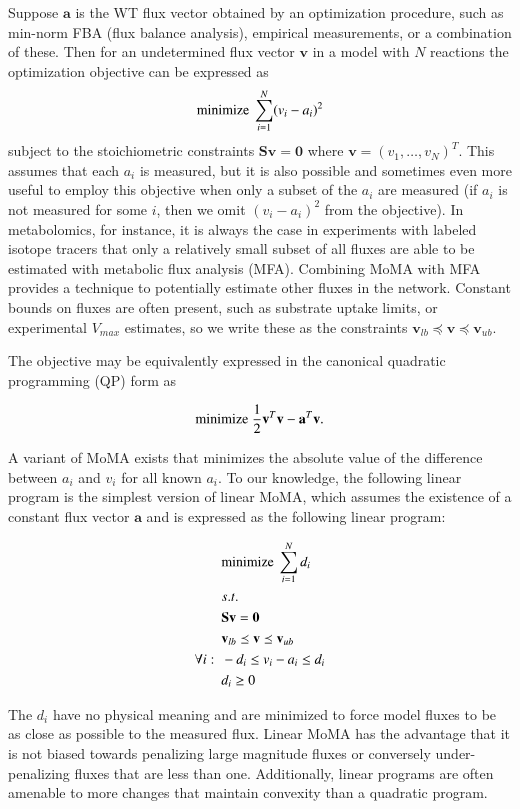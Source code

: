 Suppose $\mathbf{a}$ is the WT flux vector obtained by an optimization
procedure, such as min-norm FBA (flux balance analysis), empirical
measurements, or a combination of these. Then for an undetermined flux
vector $\mathbf{v}$ in a model with $N$ reactions the optimization
objective can be expressed as
\[ \textnormal{minimize}\ \sum\limits_{i=1}^N (v_i-a_i)^2 \] subject to the
stoichiometric constraints $\mathbf{S v} = \mathbf{0}$ where
$\mathbf{v} = (v_1, \ldots, v_N)^T$. This assumes that each $a_i$ is
measured, but it is also possible and sometimes even more useful to
employ this objective when only a subset of the $a_i$ are measured (if
$a_i$ is not measured for some $i$, then we omit $(v_i-a_i)^2$ from
the objective). In metabolomics, for instance, it is always the case
in experiments with labeled isotope tracers that only a relatively
small subset of all fluxes are able to be estimated with metabolic
flux analysis (MFA). Combining MoMA with MFA provides a technique to
potentially estimate other fluxes in the network.  Constant bounds on
fluxes are often present, such as substrate uptake limits, or
experimental $V_{max}$ estimates, so we write these as the constraints
$\mathbf{v}_{lb} \preceq \mathbf{v} \preceq \mathbf{v}_{ub}$.

The objective may be equivalently expressed in the canonical quadratic
programming (QP) form as

\[ \textnormal{minimize}\ \frac{1}{2}\mathbf{v}^T \mathbf{v} -
\mathbf{a}^T \mathbf{v}\textnormal{.}\]

A variant of MoMA exists that minimizes the absolute value of the
difference between $a_i$ and $v_i$ for all known $a_i$. To our
knowledge, the following linear program is the simplest version of
linear MoMA, which assumes the existence of a constant flux vector
$\mathbf{a}$ and is expressed as the following linear program:

\begin{align*}
&\textnormal{minimize}\ \sum\limits_{i=1}^N d_i  \\
&s.t.\\
&\mathbf{S v} = \mathbf{0} \\
&\mathbf{v}_{lb} \preceq \mathbf{v} \preceq \mathbf{v}_{ub} \\
\forall i:~~&-d_i \le v_i-a_i \le d_i \\
&d_i \ge 0
\end{align*}

The $d_i$ have no physical meaning and are minimized to force model
fluxes to be as close as possible to the measured flux.  Linear MoMA
has the advantage that it is not biased towards penalizing large
magnitude fluxes or conversely under-penalizing fluxes that are less
than one. Additionally, linear programs are often amenable to more
changes that maintain convexity than a quadratic program.

